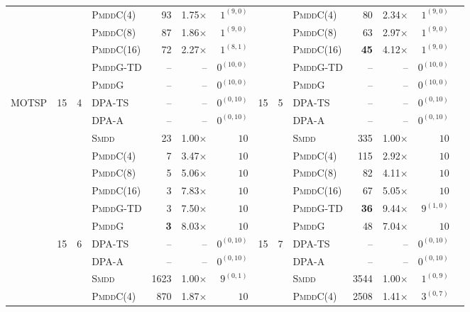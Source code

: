 \documentclass[letterpaper]{article}
\begin{document}
\begin{table}[htbp!]
{\begin{tabular}{lrrlrrrrrlrrrr}
 &  &  & \textsc{PmddC}(4) & 93 & 1.75$\times$ & $1^{(9, 0)}$ &  &  & \textsc{PmddC}(4) & 80 & 2.34$\times$ & $1^{(9, 0)}$\\
 &  &  & \textsc{PmddC}(8) & 87 & 1.86$\times$ & $1^{(9, 0)}$  &  &  & \textsc{PmddC}(8) & 63 & 2.97$\times$ & $1^{(9, 0)}$\\
 &  &  & \textsc{PmddC}(16) & 72 & 2.27$\times$ & $1^{(8, 1)}$ &  &  & \textsc{PmddC}(16) & \textbf{45} & 4.12$\times$ & $1^{(9, 0)}$\\
 &  &  & \textsc{PmddG-TD} & -- & -- & $0^{(10, 0)}$  &  &  & \textsc{PmddG-TD} & -- & -- & $0^{(10, 0)}$\\
 &  &  & \textsc{PmddG} & -- & -- & $0^{(10, 0)}$  & &  & \textsc{PmddG} & -- & -- & $0^{(10, 0)}$\\
\midrule
\multirow{16}{*}{MOTSP} & \multirow{8}{*}{15} & \multirow{8}{*}{4} & DPA-TS & -- & -- & $0^{(0, 10)}$ & \multirow{8}{*}{15} & \multirow{8}{*}{5} & DPA-TS & -- & -- & $0^{(0, 10)}$ \\
 &  &  & DPA-A & -- & -- & $0^{(0, 10)}$ &  &  & DPA-A & -- & -- & $0^{(0, 10)}$ \\
 &  &  & \textsc{Smdd} & 23 & 1.00$\times$ & $10$ &  &  & \textsc{Smdd} & 335 & 1.00$\times$ & $10$ \\
 &  &  & \textsc{PmddC}(4) & 7 & 3.47$\times$ & $10$ &  &  & \textsc{PmddC}(4) & 115 & 2.92$\times$ & $10$ \\
 &  &  & \textsc{PmddC}(8) & 5 & 5.06$\times$ & $10$ &  &  & \textsc{PmddC}(8) & 82 & 4.11$\times$ & $10$ \\
 &  &  & \textsc{PmddC}(16) & 3 & 7.83$\times$ & $10$ &  &  & \textsc{PmddC}(16) & 67 & 5.05$\times$ & $10$ \\
 &  &  & \textsc{PmddG-TD} & 3 & 7.50$\times$ & $10$ &  &  & \textsc{PmddG-TD} & \textbf{36} & 9.44$\times$ & $9^{(1, 0)}$ \\
 &  &  & \textsc{PmddG} & \textbf{3} & 8.03$\times$ & $10$ &  &  & \textsc{PmddG} & 48 & 7.04$\times$ & $10$ \\
\cmidrule(lr){2-13}
 & \multirow{8}{*}{15} & \multirow{8}{*}{6} & DPA-TS & -- & -- & $0^{(0, 10)}$ & \multirow{8}{*}{15} & \multirow{8}{*}{7} & DPA-TS & -- & -- & $0^{(0, 10)}$ \\
 &  &  & DPA-A & -- & -- & $0^{(0, 10)}$ &  &  & DPA-A & -- & -- & $0^{(0, 10)}$ \\
 &  &  & \textsc{Smdd} & 1623 & 1.00$\times$ & $9^{(0, 1)}$ &  &  & \textsc{Smdd} & 3544 & 1.00$\times$ & $1^{(0, 9)}$ \\
 &  &  & \textsc{PmddC}(4) & 870 & 1.87$\times$ & $10$ &  &  & \textsc{PmddC}(4) & 2508 & 1.41$\times$ & $3^{(0, 7)}$ \\

\end{tabular}}
\end{table}
\end{document}
